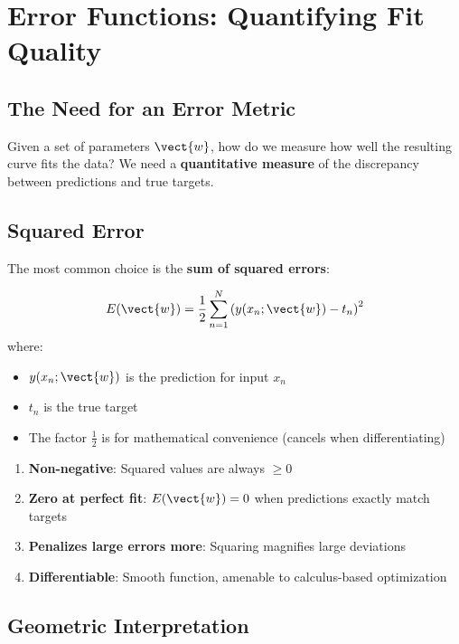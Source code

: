 \section{Error Functions: Quantifying Fit Quality}

\subsection{The Need for an Error Metric}

Given a set of parameters $\vect{w}$, how do we measure how well the resulting curve fits the data? We need a \textbf{quantitative measure} of the discrepancy between predictions and true targets.

\subsection{Squared Error}

The most common choice is the \textbf{sum of squared errors}:

\begin{definitionbox}
\[
E(\vect{w}) = \frac{1}{2} \sum_{n=1}^{N} \left( y(x_n; \vect{w}) - t_n \right)^2
\]
where:
\begin{itemize}
    \item $y(x_n; \vect{w})$ is the prediction for input $x_n$
    \item $t_n$ is the true target
    \item The factor $\frac{1}{2}$ is for mathematical convenience (cancels when differentiating)
\end{itemize}
\end{definitionbox}

\begin{bluebox}
\begin{enumerate}
    \item \textbf{Non-negative}: Squared values are always $\geq 0$
    \item \textbf{Zero at perfect fit}: $E(\vect{w}) = 0$ when predictions exactly match targets
    \item \textbf{Penalizes large errors more}: Squaring magnifies large deviations
    \item \textbf{Differentiable}: Smooth function, amenable to calculus-based optimization
\end{enumerate}
\end{bluebox}

\subsection{Geometric Interpretation}

